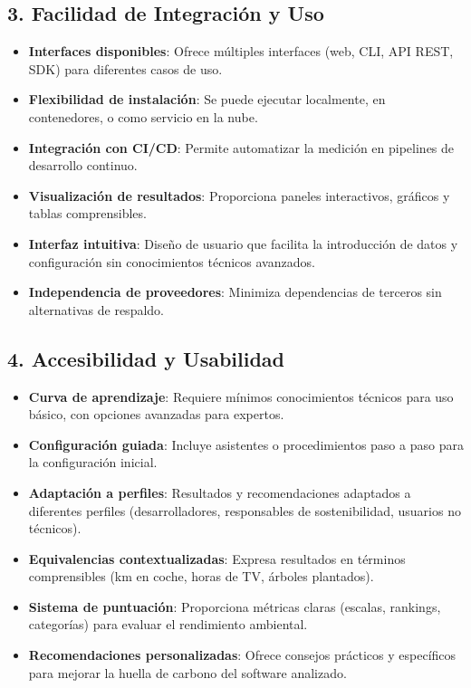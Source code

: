 \documentclass[12pt,a4paper]{report}
\begin{document}
\subsection*{3. Facilidad de Integración y Uso}
\begin{itemize}
  \item \textbf{Interfaces disponibles}: Ofrece múltiples interfaces (web, CLI, API REST, SDK) para diferentes casos de uso.
  \item \textbf{Flexibilidad de instalación}: Se puede ejecutar localmente, en contenedores, o como servicio en la nube.
  \item \textbf{Integración con CI/CD}: Permite automatizar la medición en pipelines de desarrollo continuo.
  \item \textbf{Visualización de resultados}: Proporciona paneles interactivos, gráficos y tablas comprensibles.
  \item \textbf{Interfaz intuitiva}: Diseño de usuario que facilita la introducción de datos y configuración sin conocimientos técnicos avanzados.
  \item \textbf{Independencia de proveedores}: Minimiza dependencias de terceros sin alternativas de respaldo.
\end{itemize}

\subsection*{4. Accesibilidad y Usabilidad}
\begin{itemize}
  \item \textbf{Curva de aprendizaje}: Requiere mínimos conocimientos técnicos para uso básico, con opciones avanzadas para expertos.
  \item \textbf{Configuración guiada}: Incluye asistentes o procedimientos paso a paso para la configuración inicial.
  \item \textbf{Adaptación a perfiles}: Resultados y recomendaciones adaptados a diferentes perfiles (desarrolladores, responsables de sostenibilidad, usuarios no técnicos).
  \item \textbf{Equivalencias contextualizadas}: Expresa resultados en términos comprensibles (km en coche, horas de TV, árboles plantados).
  \item \textbf{Sistema de puntuación}: Proporciona métricas claras (escalas, rankings, categorías) para evaluar el rendimiento ambiental.
  \item \textbf{Recomendaciones personalizadas}: Ofrece consejos prácticos y específicos para mejorar la huella de carbono del software analizado.
\end{itemize}
\end{document}

